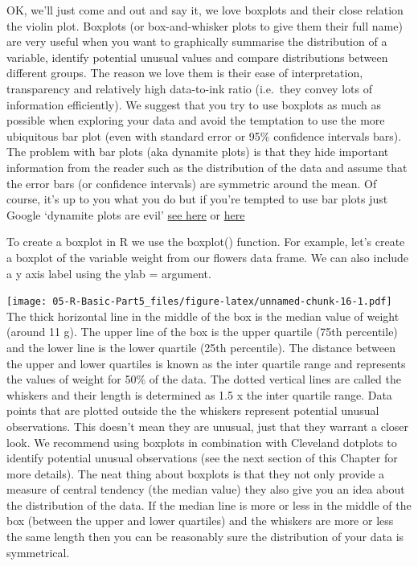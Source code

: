 \documentclass[
]{book}
\newenvironment{Shaded}{\begin{snugshade}}{\end{snugshade}}
\newcommand{\AttributeTok}[1]{\textcolor[rgb]{0.13,0.29,0.53}{#1}}
\newcommand{\FunctionTok}[1]{\textcolor[rgb]{0.13,0.29,0.53}{\textbf{#1}}}
\newcommand{\NormalTok}[1]{#1}
\newcommand{\SpecialCharTok}[1]{\textcolor[rgb]{0.81,0.36,0.00}{\textbf{#1}}}
\newcommand{\StringTok}[1]{\textcolor[rgb]{0.31,0.60,0.02}{#1}}
\begin{document}
OK, we'll just come and out and say it, we love boxplots and their close relation the violin plot. Boxplots (or box-and-whisker plots to give them their full name) are very useful when you want to graphically summarise the distribution of a variable, identify potential unusual values and compare distributions between different groups. The reason we love them is their ease of interpretation, transparency and relatively high data-to-ink ratio (i.e.~they convey lots of information efficiently). We suggest that you try to use boxplots as much as possible when exploring your data and avoid the temptation to use the more ubiquitous bar plot (even with standard error or 95\% confidence intervals bars). The problem with bar plots (aka dynamite plots) is that they hide important information from the reader such as the distribution of the data and assume that the error bars (or confidence intervals) are symmetric around the mean. Of course, it's up to you what you do but if you're tempted to use bar plots just Google `dynamite plots are evil' \href{http://users.stat.umn.edu/~rend0020/Teaching/STAT8801-2015Spring/handouts/24-dynamite.pdf}{see here} or \href{https://thenode.biologists.com/leaving-bar-five-steps/research/}{here}

To create a boxplot in R we use the boxplot() function. For example, let's create a boxplot of the variable weight from our flowers data frame. We can also include a y axis label using the ylab = argument.

\begin{Shaded}
\end{Shaded}

\texttt{[image: 05-R-Basic-Part5\_files/figure-latex/unnamed-chunk-16-1.pdf]}
The thick horizontal line in the middle of the box is the median value of weight (around 11 g). The upper line of the box is the upper quartile (75th percentile) and the lower line is the lower quartile (25th percentile). The distance between the upper and lower quartiles is known as the inter quartile range and represents the values of weight for 50\% of the data. The dotted vertical lines are called the whiskers and their length is determined as 1.5 x the inter quartile range. Data points that are plotted outside the the whiskers represent potential unusual observations. This doesn't mean they are unusual, just that they warrant a closer look. We recommend using boxplots in combination with Cleveland dotplots to identify potential unusual observations (see the next section of this Chapter for more details). The neat thing about boxplots is that they not only provide a measure of central tendency (the median value) they also give you an idea about the distribution of the data. If the median line is more or less in the middle of the box (between the upper and lower quartiles) and the whiskers are more or less the same length then you can be reasonably sure the distribution of your data is symmetrical.
\end{document}
